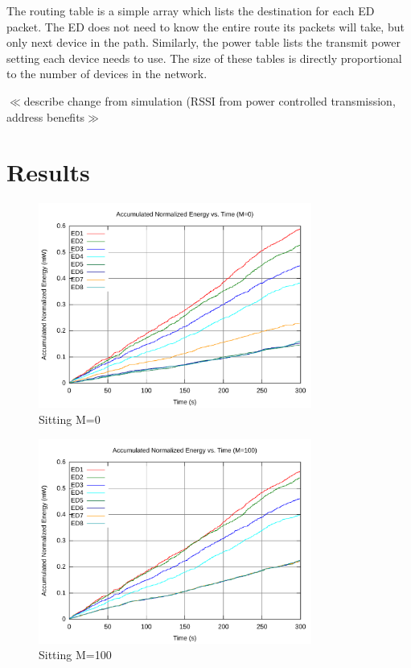 \documentclass{article}
\begin{document}
The routing table is a simple array which lists the destination for each ED packet. The ED does not need to know the entire route its packets will take, but only next device in the path. Similarly, the power table lists the transmit power setting each device needs to use. The size of these tables is directly proportional to the number of devices in the network.

$\ll$describe change from simulation (RSSI from power controlled transmission, address benefits$\gg$

\section{Results}

\begin{figure}[!ht]
\includegraphics[width=0.8\textwidth]{figures/sit1-c0.pdf}
\caption{Sitting M=0}
\label{fig:sit1-c0}
\end{figure}

\begin{figure}[!ht]
\includegraphics[width=0.8\textwidth]{figures/sit1-c100.pdf}
\caption{Sitting M=100}
\label{fig:sit1-c100}
\end{figure}
\end{document}
